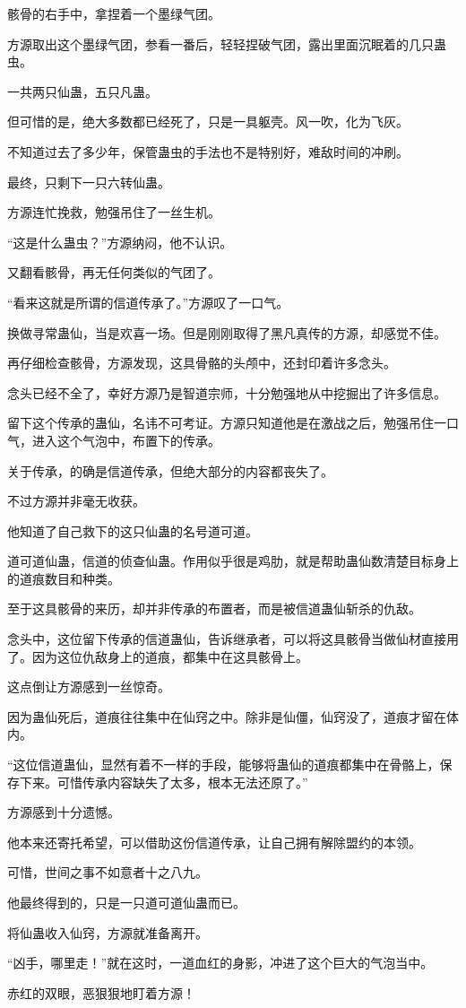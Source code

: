 \begin{this_body}
骸骨的右手中，拿捏着一个墨绿气团。

方源取出这个墨绿气团，参看一番后，轻轻捏破气团，露出里面沉眠着的几只蛊虫。

一共两只仙蛊，五只凡蛊。

但可惜的是，绝大多数都已经死了，只是一具躯壳。风一吹，化为飞灰。

不知道过去了多少年，保管蛊虫的手法也不是特别好，难敌时间的冲刷。

最终，只剩下一只六转仙蛊。

方源连忙挽救，勉强吊住了一丝生机。

“这是什么蛊虫？”方源纳闷，他不认识。

又翻看骸骨，再无任何类似的气团了。

“看来这就是所谓的信道传承了。”方源叹了一口气。

换做寻常蛊仙，当是欢喜一场。但是刚刚取得了黑凡真传的方源，却感觉不佳。

再仔细检查骸骨，方源发现，这具骨骼的头颅中，还封印着许多念头。

念头已经不全了，幸好方源乃是智道宗师，十分勉强地从中挖掘出了许多信息。

留下这个传承的蛊仙，名讳不可考证。方源只知道他是在激战之后，勉强吊住一口气，进入这个气泡中，布置下的传承。

关于传承，的确是信道传承，但绝大部分的内容都丧失了。

不过方源并非毫无收获。

他知道了自己救下的这只仙蛊的名号道可道。

道可道仙蛊，信道的侦查仙蛊。作用似乎很是鸡肋，就是帮助蛊仙数清楚目标身上的道痕数目和种类。

至于这具骸骨的来历，却并非传承的布置者，而是被信道蛊仙斩杀的仇敌。

念头中，这位留下传承的信道蛊仙，告诉继承者，可以将这具骸骨当做仙材直接用了。因为这位仇敌身上的道痕，都集中在这具骸骨上。

这点倒让方源感到一丝惊奇。

因为蛊仙死后，道痕往往集中在仙窍之中。除非是仙僵，仙窍没了，道痕才留在体内。

“这位信道蛊仙，显然有着不一样的手段，能够将蛊仙的道痕都集中在骨骼上，保存下来。可惜传承内容缺失了太多，根本无法还原了。”

方源感到十分遗憾。

他本来还寄托希望，可以借助这份信道传承，让自己拥有解除盟约的本领。

可惜，世间之事不如意者十之八九。

他最终得到的，只是一只道可道仙蛊而已。

将仙蛊收入仙窍，方源就准备离开。

“凶手，哪里走！”就在这时，一道血红的身影，冲进了这个巨大的气泡当中。

赤红的双眼，恶狠狠地盯着方源！

\end{this_body}

